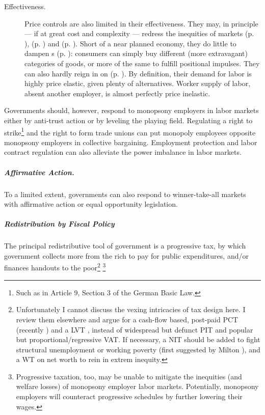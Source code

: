 \begin{description}
	\item[Effectiveness.] 
		Price controls are also limited in their effectiveness. They may, in principle --- if at great cost and complexity --- redress the inequities of  markets (p. \pageref{sec:winne-take-all}),  (p. \pageref{sec:differentbudgetconstraints}) and  (p. \pageref{sec:diminishingmarginalutility}). Short of a near planned economy, they do little to dampen s (p. \pageref{sec:positionalrace}):  consumers can simply buy different (more extravagant) categories of goods, or more of the same to fulfill positional impulses. They can also hardly reign in on  (p. \pageref{sec:monopsonyemployers}). By definition, their demand for labor is highly price elastic, given plenty of alternatives. Worker supply of labor, absent another employer, is almost perfectly price inelastic. 
\end{description}

Governments should, however, respond to monopsony employers in labor markets either by anti-trust action or by leveling the playing field. Regulating a right to strike\footnote{Such as in Article 9, Section 3 of the German Basic Law.} and the right to form trade unions can put monopoly employees opposite monopsony employers in collective bargaining. Employment protection and labor contract regulation can also alleviate the power imbalance in labor markets.

\subparagraph{Affirmative Action.}  \label{sec:affirmativeaction} To a limited extent, governments can also respond to winner-take-all markets with affirmative action or equal opportunity legislation.

\subparagraph{Redistribution by Fiscal Policy}  \label{sec:fiscalredistribution} The principal redistributive tool of government is a progressive tax, by which government collects more from the rich to pay for public expenditures, and/or finances handouts to the poor\footnote{
	Unfortunately I cannot discuss the vexing intricacies of tax design here. I review them elsewhere \citep{Held2010a} and argue for a cash-flow based, post-paid \gls{PCT} (recently \citealt{McCaffery2002,McCaffery2005}) and a \gls{LVT} \citep{George1879}, instead of widespread but defunct \gls{PIT} and popular but proportional/regressive \gls{VAT}. If necessary, a \gls{NIT} should be added to fight structural unemployment or working poverty (first suggested by Milton \citealt{Friedman1962}), and a \gls{WT} on net worth to rein in extrem inequity.}
	\footnote{
	Progressive taxation, too, may be unable to mitigate the inequities (and welfare losses) of monopsony employer labor markets. Potentially, monopsony employers will counteract progressive schedules by further lowering their wages.} 

